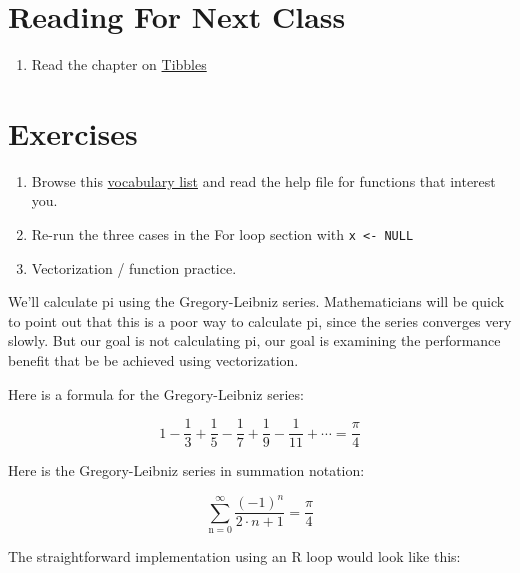 \documentclass[]{book}
\providecommand{\tightlist}{%
  \setlength{\itemsep}{0pt}\setlength{\parskip}{0pt}}
\theoremstyle{definition}
\theoremstyle{definition}
\theoremstyle{definition}
\theoremstyle{remark}
\begin{document}
\hypertarget{reading-for-next-class-1}{%
\section{Reading For Next Class}\label{reading-for-next-class-1}}

\begin{enumerate}
\def\labelenumi{\arabic{enumi}.}
\tightlist
\item
  Read the chapter on \href{http://r4ds.had.co.nz/tibbles.html}{Tibbles}
\end{enumerate}

\hypertarget{exercises-1}{%
\section{Exercises}\label{exercises-1}}

\begin{enumerate}
\def\labelenumi{\arabic{enumi}.}
\tightlist
\item
  Browse this \href{http://adv-r.had.co.nz/Vocabulary.html}{vocabulary
  list} and read the help file for functions that interest you.
\item
  Re-run the three cases in the For loop section with
  \texttt{x\ \textless{}-\ NULL}
\item
  Vectorization / function practice.
\end{enumerate}

We'll calculate pi using the Gregory-Leibniz series. Mathematicians will
be quick to point out that this is a poor way to calculate pi, since the
series converges very slowly. But our goal is not calculating pi, our
goal is examining the performance benefit that be be achieved using
vectorization.

Here is a formula for the Gregory-Leibniz series:

\begin{equation}
1 - \frac{1}{3} + \frac{1}{5} - \frac{1}{7} + \frac{1}{9} - \frac{1}{11} + \cdots = \frac{\pi}{4}
\end{equation}

Here is the Gregory-Leibniz series in summation notation:

\begin{equation}
\sum_{\text{n}=0}^{\infty} \frac{(-1)^n}{2\cdot n + 1} = \frac{\pi}{4}
\end{equation}

The straightforward implementation using an R loop would look like this:
\end{document}
